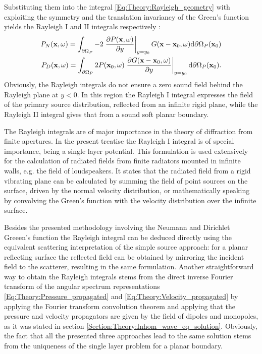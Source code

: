 Substituting them into the integral \eqref{Eq:Theory:Rayleigh_geometry} with exploiting the symmetry and the translation invariancy of the Green's function yields the Rayleigh I and II integrals respectively \cite{Berkhout1984}:
\begin{eqnarray}
P_N(\mathbf{x},\omega) =
\int_{\partial \Omega_P}
-2
\left. \frac{\partial P(\mathbf{x},\omega)}{\partial y} \right|_{y = y_0} 
G(\mathbf{x}-\mathbf{x}_0,\omega) \mathrm{d} \partial \Omega_P ( \mathbf{x}_0)
\label{Eq:Theory:RayleighI}
\\
P_D(\mathbf{x},\omega) =
\int_{\partial \Omega_P}
2 P(\mathbf{x}_0,\omega)  
\left. \frac{\partial G(\mathbf{x}-\mathbf{x}_0,\omega)}{\partial y} \right|_{y = y_0} 
\mathrm{d} \partial \Omega_P ( \mathbf{x}_0).
\label{Eq:Theory:RayleighII}
\end{eqnarray}
Obviously, the Rayleigh integrals do not ensure a zero sound field behind the Rayleigh plane at $y<0$.
In this region the Rayleigh I integral expresses the field of the primary source distribution, reflected from an infinite rigid plane, while the Rayleigh II integral gives that from a sound soft planar boundary.

The Rayleigh integrals are of major importance in the theory of diffraction from finite apertures.
In the present treatise the Rayleigh I integral is of special importance, being a single layer potential.
This formulation is used extensively for the calculation of radiated fields from finite radiators mounted in infinite walls, e.g. the field of loudspeakers.
It states that the radiated field from a rigid vibrating plane can be calculated by summing the field of point sources on the surface, driven by the normal velocity distribution, or mathematically speaking by convolving the Green's function with the velocity distribution over the infinite surface.

\vspace{3mm}
Besides the presented methodology involving the Neumann and Dirichlet Greeen's function the Rayleigh integral can be deduced directly using the equivalent scattering interpretation of the simple source approach: for a planar reflecting surface the reflected field can be obtained by mirroring the incident field to the scatterer, resulting in the same formulation.
Another straightforward way to obtain the Rayleigh integrals stems from the direct inverse Fourier transform of the angular spectrum representations \eqref{Eq:Theory:Pressure_propagated} and \eqref{Eq:Theory:Velocity_propagated} by applying the Fourier transform convolution theorem and applying that the pressure and velocity propagators are given by the field of dipoles and monopoles, as it was stated in section \ref{Section:Theory:Inhom_wave_eq_solution}.
Obviously, the fact that all the presented three approaches lead to the same solution stems from the uniqueness of the single layer problem for a planar boundary.